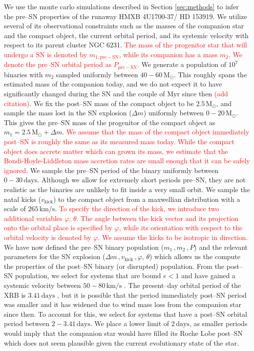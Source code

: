 \documentclass[linenumbers,trackchanges,twocolumn]{aastex701}
\newcommand{\Mdot}{\mathrm{M}_{\odot}}
\newcommand{\red}{\textcolor{red}}
\begin{document}
We use the monte carlo simulations described in Section \ref{sec:methods} to infer the pre--SN properties of the runaway HMXB 4U1700-37/ HD 153919. We utilize several of its observational constraints such as the masses of the companion star and the compact object, the current orbital period, and its systemic velocity with respect to its parent cluster NGC 6231. \red{The mass of the progenitor star that will undergo a SN is denoted by $m_{1,\mathrm{pre-SN}}$, while its companion has a mass $m_2$. We denote the pre--SN orbital period as $P_{\mathrm{pre-SN}}$.} We generate a population of $10^7$ binaries with $m_2$ sampled uniformly between $40-60\,\Mdot$. This roughly spans the estimated mass of the companion today, and we do not expect it to have significantly changed during the SN and the couple of $\mathrm{Myr}$ since then \red{(add citation)}. We fix the post--SN mass of the compact object to be $2.5 \, \Mdot$, and sample the mass lost in the SN explosion ($\Delta m$) uniformly between $0-20 \, \Mdot$. This gives the pre--SN mass of the progenitor of the compact object as $m_1 = 2.5\, \Mdot + \Delta m$. \red{We assume that the mass of the compact object immediately post--SN is roughly the same as its measured mass today. While the compact object does accrete matter which can grown its mass, we estimate that the Bondi-Hoyle-Liddleton mass accretion rates are small enough that it can be safely ignored.} We sample the pre--SN period of the binary uniformly between $0-30\, \mathrm{days}$. Although we allow for extremely short periods pre--SN, they are not realistic as the binaries are unlikely to fit inside a very small orbit. We sample the natal kicks ($v_{\mathrm{kick}}$) to the compact object from a maxwellian distribution with a scale of $265 \, \mathrm{km/s}$. \red{To specify the direction of the kick, we introduce two additional variables $\varphi,\, \theta$. The angle between the kick vector and its projection onto the orbital place is specified by $\varphi$, while its orientation with respect to the orbital velocity is denoted by $\varphi$. We assume the kicks to be isotropic in direction.} We have now defined the pre--SN binary population ($m_1\,, m_2\,, P$) and the relevant parameters for the SN explosion ($\Delta m\,, v_{\mathrm{kick}}\,, \varphi,\, \theta$) which allows us the compute the properties of the post--SN binary (or disrupted) population. From the post--SN population, we select for systems that are bound $e<1$ and have gained a systemic velocity between $50-80 \, \mathrm{km/s}$ \citep{2021A&A...655A..31V}. The present--day orbital period of the XRB is $3.41 \, \mathrm{days}$ \citep{2016MNRAS.461..816I}, but it is possible that the period immediately post--SN period was smaller and it has widened due to wind mass loss from the companion star since then. To account for this, we select for systems that have a post--SN orbital period between $2-3.41 \, \mathrm{days}$. We place a lower limit of $2 \, \mathrm{days}$, as smaller periods would imply that the companion star would have filled its Roche Lobe post--SN which does not seem plausible given the current evolutionary state of the star. 
\end{document}
